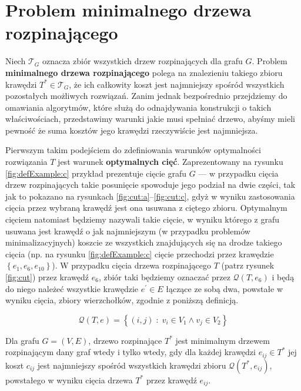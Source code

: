 \section{Problem minimalnego drzewa rozpinającego}

Niech $\mathcal{T}_{G}$ oznacza zbiór wszystkich drzew rozpinających dla grafu $G$. Problem \textbf{minimalnego drzewa rozpinającego} polega na znalezieniu takiego zbioru krawędzi $T^{\ast} \in \mathcal{T}_{G}$, że ich całkowity koszt jest najmniejszy spośród wszystkich pozostałych możliwych rozwiązań. Zanim jednak bezpośrednio przejdziemy do omawiania algorytmów, które służą do odnajdywania konstrukcji o takich właściwościach, przedstawimy warunki jakie musi spełniać drzewo, abyśmy mieli pewność że suma kosztów jego krawędzi rzeczywiście jest najmniejsza.

Pierwszym takim podejściem do zdefiniowania warunków optymalności rozwiązania $T$ jest warunek \textbf{optymalnych cięć}. Zaprezentowany na rysunku \ref{fig:defExample:c} przykład prezentuje cięcie grafu $G$ --- w przypadku cięcia drzew rozpinających takie posunięcie spowoduje jego podział na dwie części, tak jak to pokazano na rysunkach \ref{fig:cut:a}--\ref{fig:cut:c}, gdyż w wyniku zastosowania cięcia przez wybraną krawędź jest ona usuwana z ciętego zbioru. Optymalnym cięciem natomiast będziemy nazywali takie cięcie, w wyniku którego z grafu usuwana jest krawędź o jak najmniejszym (w przypadku problemów minimalizacyjnych) koszcie ze wszystkich znajdujących się na drodze takiego cięcia (np. na rysunku \ref{fig:defExample:c} cięcie przechodzi przez krawędzie $\left\{ e_{1}, e_{6}, e_{10} \right\}$). W przypadku cięcia drzewa rozpinającego $T$ (patrz rysunek \ref{fig:cut}) przez krawędź $e_{6}$, zbiór taki będziemy oznaczać przez $\mathcal{Q} \left( T, e_{6} \right)$ i będą do niego należeć wszystkie krawędzie $e^{\prime} \in E$ łączące ze sobą dwa, powstałe w wyniku cięcia, zbiory wierzchołków, zgodnie z poniższą definicją.

\begin{equation}\label{eq:treecutedgeset}
\mathcal{Q} \left( T, e \right) = \left\{ \left( i, j \right) \; : \; v_{i} \in V_{1} \wedge v_{j} \in V_{2} \right\}
\end{equation}

\begin{theorem}\label{def:optmstcut}
	Dla grafu $G = \left( V, E \right)$, drzewo rozpinające $T^{\ast}$ jest minimalnym drzewem rozpinającym dany graf wtedy i tylko wtedy, gdy dla każdej krawędzi $e_{ij} \in T^{\ast}$ jej koszt $c_{ij}$ jest najmniejszy spośród wszystkich krawędzi zbioru $\mathcal{Q} \left( T^{\ast}, e_{ij} \right)$, powstałego w wyniku cięcia drzewa $T^{\ast}$ przez krawędź $e_{ij}$.
\end{theorem}

